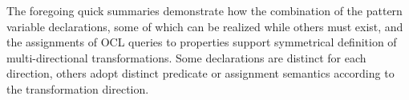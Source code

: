 The foregoing quick summaries demonstrate how the combination of the pattern variable declarations, some of which can be realized while others must exist, and the assignments of OCL queries to properties support symmetrical definition of multi-directional transformations. Some declarations are distinct for each direction, others adopt distinct predicate or assignment semantics according to the transformation direction.




